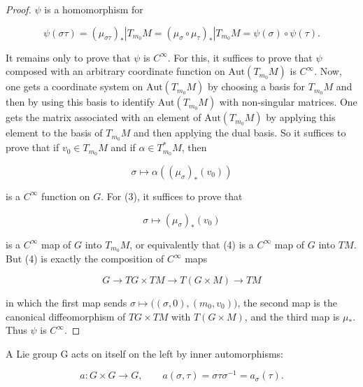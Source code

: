 \begin{proof}
$ \psi $ is a homomorphism for

\begin{equation}
\tag{3}\label{eq:3.45:3}
\psi(\sigma\tau)=(\mu_{\sigma\tau})_{*}\left|T_{m_{0}} M=(\mu_{\sigma}\circ\mu_{\tau})_{*}\right|T_{m_{0}} M=\psi(\sigma)\circ\psi(\tau).
\end{equation}

It remains only to prove that $\psi$ is $C^{\infty}$. For this, it suffices to prove that $\psi$ composed with an arbitrary coordinate function on $\mathrm{Aut}(T_{m_0} M)$ is $C^{\infty}$. Now, one gets a coordinate system on $\mathrm{Aut}(T_{m_0} M)$ by choosing a basis for $T_{m_0} M$ and then by using this basis to identify $\mathrm{Aut}(T_{m_0} M)$ with non-singular matrices. One gets the matrix associated with an element of $\mathrm{Aut}(T_{m_0} M)$ by applying this element to the basis of $T_{m_0} M$ and then applying the dual basis. So it suffices to prove that if $v_0 \in T_{m_0} M$ and if $\alpha \in T_{m_0}^{*} M$, then

\begin{equation}
\sigma\mapsto\alpha\left((\mu_{\sigma})_{*}(v_{0})\right)
\end{equation}

is a $C^{\infty}$ function on $G$. For (3), it suffices to prove that

\begin{equation}
\tag{4}\label{eq:3.45:4}
\sigma\mapsto (\mu_{\sigma})_{*}(v_{0})
\end{equation}

is a $C^{\infty}$ map of $G$ into $T_{m_{0}} M$, or equivalently that (4) is a $C^{\infty}$ map of $G$ into $TM$. But (4) is exactly the composition of $C^{\infty}$ maps

\[
G\to TG\times TM\to T(G\times M)\to TM
\]

in which the first map sends $\sigma \mapsto \big((\sigma,0),(m_0,v_0)\big)$, the second map is the canonical diffeomorphism of $TG \times TM$ with $T(G \times M)$, and the third map is $\mu_{*}$. Thus $\psi$ is $C^\infty$.

\end{proof}
\label{thm:3.46}
A Lie group G acts on itself on the left by inner automorphisms:

\begin{equation}
\tag{1}\label{eq:3.46:1}
a\colon G\times G\to G,\qquad a(\sigma,\tau)=\sigma\tau\sigma^{-1}=a_{\sigma}(\tau).
\end{equation}


